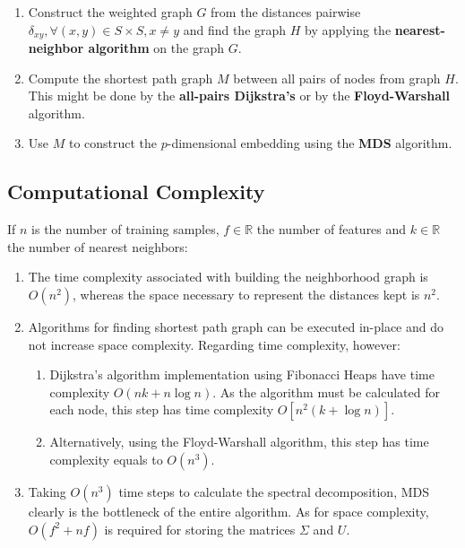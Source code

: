 \documentclass[12pt]{report}
\begin{document}
\begin{enumerate}
	\item Construct the weighted graph $G$ from the distances pairwise $\delta_{xy}, \forall (x, y) \in S \times S, x \ne y$ and find the graph $H$ by applying the \textbf{nearest-neighbor algorithm} on the graph $G$.

	\item Compute the shortest path graph $M$ between all pairs of nodes from graph $H$. This might be done by the \textbf{all-pairs Dijkstra's} or by the \textbf{Floyd-Warshall} algorithm.

	\item Use $M$ to construct the $p$-dimensional embedding using the \textbf{MDS} algorithm.
\end{enumerate}

\subsection{Computational Complexity}
\label{sec:isocomplexity}

If $n$ is the number of training samples, $f \in \mathbb{R}$ the number of features and $k \in \mathbb{R}$ the number of nearest neighbors:

\begin{enumerate}
	\item The time complexity associated with building the neighborhood graph is $O(n^2)$, whereas the space necessary to represent the distances kept is $n^2$.
	\item Algorithms for finding shortest path graph can be executed in-place and do not increase space complexity. Regarding time complexity, however:
	\begin{enumerate}
		\item Dijkstra's algorithm implementation using Fibonacci Heaps have time complexity $O(nk + n \log n)$. As the algorithm must be calculated for each node, this step has time complexity $O[n^2(k + \log n)]$.
		\item Alternatively, using the Floyd-Warshall algorithm, this step has time complexity equals to $O(n^3)$.
	\end{enumerate}
	\item Taking $O(n^3)$ time steps to calculate the spectral decomposition, MDS clearly is the bottleneck of the entire algorithm. \cite{cay2005} \cite{silva2002global} As for space complexity, $O(f^2 + nf)$ is required for storing the matrices $\Sigma$ and $U$.
\end{enumerate}
\end{document}
